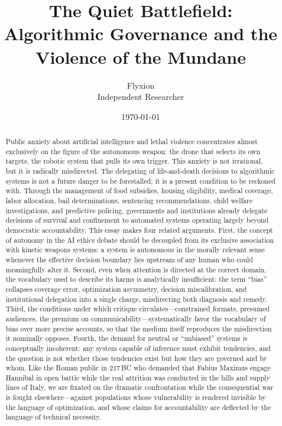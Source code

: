 \documentclass[12pt, a4paper]{article}
\title{\large\textbf{The Quiet Battlefield:\\
\normalsize Algorithmic Governance and the Violence of the Mundane}}
\author{Flyxion\\[0.3em]\small Independent Researcher}
\date{\today}
\begin{document}
\maketitle
\thispagestyle{empty}

\begin{abstract}
\noindent Public anxiety about artificial intelligence and lethal violence concentrates almost exclusively on the figure of the autonomous weapon: the drone that selects its own targets, the robotic system that pulls its own trigger. This anxiety is not irrational, but it is radically misdirected. The delegating of life-and-death decisions to algorithmic systems is not a future danger to be forestalled; it is a present condition to be reckoned with. Through the management of food subsidies, housing eligibility, medical coverage, labor allocation, bail determinations, sentencing recommendations, child welfare investigations, and predictive policing, governments and institutions already delegate decisions of survival and confinement to automated systems operating largely beyond democratic accountability. This essay makes four related arguments. First, the concept of autonomy in the AI ethics debate should be decoupled from its exclusive association with kinetic weapons systems: a system is autonomous in the morally relevant sense whenever the effective decision boundary lies upstream of any human who could meaningfully alter it. Second, even when attention is directed at the correct domain, the vocabulary used to describe its harms is analytically insufficient: the term \enquote{bias} collapses coverage error, optimization asymmetry, decision miscalibration, and institutional delegation into a single charge, misdirecting both diagnosis and remedy. Third, the conditions under which critique circulates---constrained formats, presumed audiences, the premium on communicability---systematically favor the vocabulary of bias over more precise accounts, so that the medium itself reproduces the misdirection it nominally opposes. Fourth, the demand for neutral or \enquote{unbiased} systems is conceptually incoherent: any system capable of inference must exhibit tendencies, and the question is not whether those tendencies exist but how they are governed and by whom. Like the Roman public in 217\,BC who demanded that Fabius Maximus engage Hannibal in open battle while the real attrition was conducted in the hills and supply lines of Italy, we are fixated on the dramatic confrontation while the consequential war is fought elsewhere---against populations whose vulnerability is rendered invisible by the language of optimization, and whose claims for accountability are deflected by the language of technical necessity.
\end{abstract}
\end{document}
